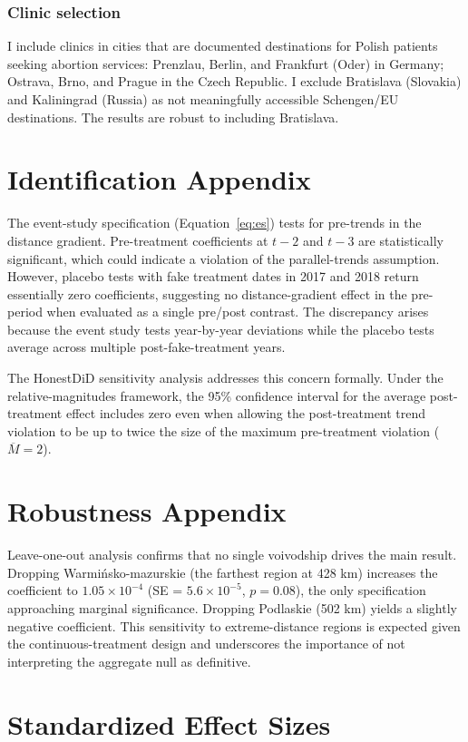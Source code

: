 \documentclass[12pt]{article}
\begin{document}
\subsubsection*{Clinic selection} I include clinics in cities that are documented destinations for Polish patients seeking abortion services: Prenzlau, Berlin, and Frankfurt (Oder) in Germany; Ostrava, Brno, and Prague in the Czech Republic. I exclude Bratislava (Slovakia) and Kaliningrad (Russia) as not meaningfully accessible Schengen/EU destinations. The results are robust to including Bratislava.

\section{Identification Appendix}
\label{app:id}

The event-study specification (Equation~\ref{eq:es}) tests for pre-trends in the distance gradient. Pre-treatment coefficients at $t-2$ and $t-3$ are statistically significant, which could indicate a violation of the parallel-trends assumption. However, placebo tests with fake treatment dates in 2017 and 2018 return essentially zero coefficients, suggesting no distance-gradient effect in the pre-period when evaluated as a single pre/post contrast. The discrepancy arises because the event study tests year-by-year deviations while the placebo tests average across multiple post-fake-treatment years.

The HonestDiD sensitivity analysis addresses this concern formally. Under the \citet{rambachan2023} relative-magnitudes framework, the 95\% confidence interval for the average post-treatment effect includes zero even when allowing the post-treatment trend violation to be up to twice the size of the maximum pre-treatment violation ($\overline{M} = 2$).

\section{Robustness Appendix}
\label{app:robust}

Leave-one-out analysis confirms that no single voivodship drives the main result. Dropping Warmi\'{n}sko-mazurskie (the farthest region at 428 km) increases the coefficient to $1.05 \times 10^{-4}$ (SE = $5.6 \times 10^{-5}$, $p = 0.08$), the only specification approaching marginal significance. Dropping Podlaskie (502 km) yields a slightly negative coefficient. This sensitivity to extreme-distance regions is expected given the continuous-treatment design and underscores the importance of not interpreting the aggregate null as definitive.

\section{Standardized Effect Sizes}
\label{sec:sde}


\end{document}
